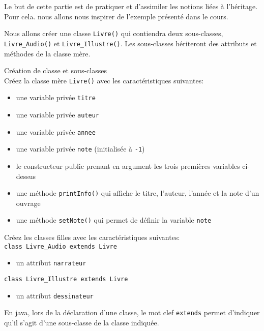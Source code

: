 Le but de cette partie est de pratiquer et d'assimiler les notions liées à l'héritage. Pour cela. nous allons nous inspirer de l'exemple présenté dans le cours. 

Nous allons créer une classe \lstinline{Livre()} qui contiendra deux sous-classes, \lstinline{Livre_Audio()} et \lstinline{Livre_Illustre()}. Les sous-classes hériteront des attributs et méthodes de la classe mère. 

\begin{Exercice}[10 minutes] Création de classe et sous-classes\\

Créez la classe mère \lstinline{Livre()} avec les caractéristiques suivantes:
\begin{itemize}
	\item une variable privée \lstinline{titre}
	\item une variable privée \lstinline{auteur}
	\item une variable privée \lstinline{annee}
	\item une variable privée \lstinline{note} (initialisée à \lstinline{-1})
	\item le constructeur public prenant en argument les trois premières variables ci-dessus
	\item une méthode \lstinline{printInfo()} qui affiche le titre, l'auteur, l'année et la note d'un ouvrage
	\item une méthode \lstinline{setNote()} qui permet de définir la variable \lstinline{note}
\end{itemize}

Créez les classes filles avec les caractéristiques suivantes:\\
\lstinline{class Livre_Audio extends Livre}
\begin{itemize}
	\item un attribut \lstinline{narrateur}

\end{itemize}
\lstinline{class Livre_Illustre extends Livre}
\begin{itemize}
	\item un attribut \lstinline{dessinateur}

\end{itemize}



\begin{conseil}
En java, lors de la déclaration d'une classe, le mot clef \lstinline{extends} permet d'indiquer qu'il s'agit d'une sous-classe de la classe indiquée. 


\end{conseil}
\end{Exercice}
